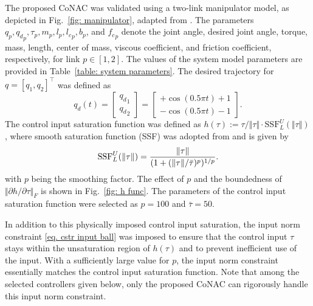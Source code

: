 \documentclass[lettersize,journal]{IEEEtran}
\begin{document}
The proposed CoNAC was validated using a two-link manipulator model, as depicted in Fig.~\ref{fig: manipulator}, adapted from \cite{Markus:2013aa}. 
The parameters $q_p,{q_d}_p,\tau_p,m_p,l_p,{l_c}_p,b_p$, and ${f_c}_p$ denote the joint angle, desired joint angle, torque, mass, length, center of mass, viscous coefficient, and friction coefficient, respectively, for link $p\in[1,2]$.
The values of the system model parameters are provided in Table~\ref{table: system parameters}. The desired trajectory for ${q}=[q_1,q_2]^\top$ was defined as
\begin{equation}
    {q_d}(t) = 
    \begin{bmatrix}
        {q_d}_1\\{q_d}_2
    \end{bmatrix}
    =
    \begin{bmatrix}
        +\cos(0.5\pi t) + 1 \\
        -\cos(0.5\pi t) - 1 
    \end{bmatrix}.
\end{equation}
The control input saturation function was defined as $h(\tau):= \tau/\Vert\tau\Vert \cdot \text{SSF}_L^U(\Vert\tau\Vert)$, where smooth saturation function (SSF) was adopted from \cite{Vasquez-Plaza:2023aa} and is given by
\begin{equation}
    \text{SSF}_L^U(\Vert\tau\Vert) = {\Vert\tau\Vert\over (1+(\Vert\tau\Vert/\bar\tau)^p)^{1/p}}.
    \label{eq. h func}
\end{equation}
with $p$ being the smoothing factor. The effect of $p$ and the boundedness of $\Vert\partial h/\partial \tau\Vert_F$ is shown in Fig.~\ref{fig: h func}.
The parameters of the control input saturation function were selected as $p=100$ and $\bar\tau=50$. 

In addition to this physically imposed control input saturation, the input norm constraint \eqref{eq. cstr input ball} was imposed to ensure that the control input $\tau$ stays within the unsaturation region of $h(\tau)$ and to prevent inefficient use of the input. With a sufficiently large value for $p$, the input norm constraint essentially matches the control input saturation function. Note that among the selected controllers given below, only the proposed CoNAC can rigorously handle this input norm constraint.
\end{document}
